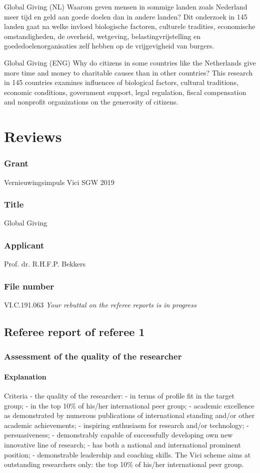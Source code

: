 \documentclass[twocolumn, serif, rga, numeric]{jote-article}
\begin{document}
Global Giving (NL) 
Waarom geven mensen in sommige landen zoals Nederland meer tijd en geld aan goede doelen dan in andere landen? Dit onderzoek in 145 landen gaat na welke invloed biologische factoren, culturele tradities, economische omstandigheden, de overheid, wetgeving, belastingvrijstelling en goededoelenorganisaties zelf hebben op de vrijgevigheid van burgers.

Global Giving (ENG) 
Why do citizens in some countries like the Netherlands give more time and money to charitable causes than in other countries? This research in 145 countries examines influences of biological factors, cultural traditions, economic conditions, government support, legal regulation, fiscal compensation and nonprofit organizations on the generosity of citizens.

\section{Reviews}
\subsubsection{Grant}
Vernieuwingsimpuls Vici SGW 2019
\subsubsection{Title }
Global Giving
\subsubsection{Applicant}
Prof. dr. R.H.F.P. Bekkers
\subsubsection{File number}
VI.C.191.063
\textit{Your rebuttal on the referee reports is in progress}

\subsection{Referee report of referee 1}

\subsubsection{Assessment of the quality of the researcher}

\paragraph{Explanation}
Criteria - the quality of the researcher: - in terms of profile fit in the target group; - in the top 10\% of his/her international peer group; - academic excellence as demonstrated by numerous publications of international standing and/or other academic achievements; - inspiring enthusiasm for research and/or technology; - persuasiveness; - demonstrably capable of successfully developing own new innovative line of research; - has both a national and international prominent position; - demonstrable leadership and coaching skills. The Vici scheme aims at outstanding researchers only: the top 10\% of his/her international peer group.
\end{document}
